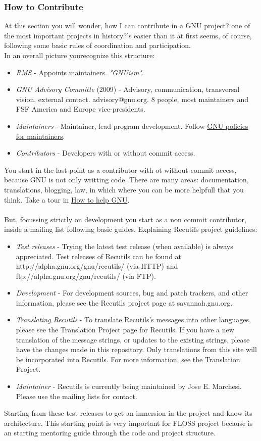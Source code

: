 \subsubsection{ How to Contribute} At this section you will wonder, how I can contribute in a GNU project? one of the most important projects in history?\nolinebreakIt's easier than it at first seems, of course, following some basic rules of coordination and participation.
\\ In an overall picture you\nolinebreakcan recognize this structure:
\begin{itemize}
	\item \textit{RMS} - Appoints maintainers. \textit{"GNUism"}.
	\item \textit{GNU Advisory Committe} (2009) - Advisory, communication, transversal vision, external contact. advisory@gnu.org. 8 people, most maintainers and FSF America and Europe vice-presidents.
	\item \textit{Maintainers} - Maintainer, lead program development. Follow \href{http://www.gnu.org/prep/maintain_toc.html}{GNU policies for maintainers}.
	\item \textit{Contributors} - Developers with or without commit access.
\end{itemize} You start in the last point as a contributor with ot without commit access, because GNU is not only writting code. There are many areas: documentation, translations, blogging, law, in which where you can be more helpfull that you think. Take a tour in \href{http://www.gnu.org/help/}{How to help GNU}.
\\
\\ But, focussing strictly on development you start as a non commit contributor, inside a mailing list following basic guides. Explaining Recutils project guidelines:
\\
\begin{itemize}
	\item \textit{Test releases} - Trying the latest test release (when available) is always appreciated. Test releases of Recutils can be found at http://alpha.gnu.org/gnu/recutils/ (via HTTP) and ftp://alpha.gnu.org/gnu/recutils/ (via FTP).
	\item \textit{Development} - For development sources, bug and patch trackers, and other information, please see the Recutils project page at savannah.gnu.org.
	\item \textit{Translating Recutils} - To translate Recutils's messages into other languages, please see the Translation Project page for Recutils. If you have a new translation of the message strings, or updates to the existing strings, please have the changes made in this repository. Only translations from this site will be incorporated into Recutils. For more information, see the Translation Project.
	\item \textit{Maintainer} - Recutils is currently being maintained by Jose E. Marchesi. Please use the mailing lists for contact.
\end{itemize} Starting from these test releases to get an inmersion in the project and know its architecture. This starting point is very important for FLOSS project because is an starting mentoring guide through the code and project structure.
